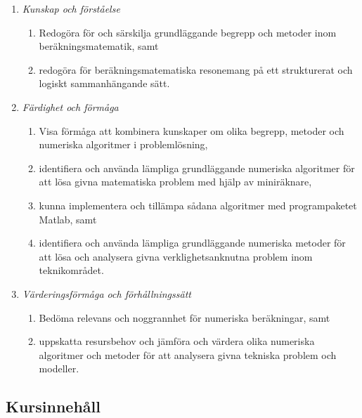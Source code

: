 \begin{enumerate}
\def\labelenumi{\Alph{enumi}.}
\tightlist
\item
  \emph{Kunskap och förståelse}

  \begin{enumerate}
  \def\labelenumii{\Alph{enumi}.\arabic{enumii}.}
  \tightlist
  \item
    Redogöra för och särskilja grundläggande begrepp och metoder inom
    beräkningsmatematik, samt
  \item
    redogöra för beräkningsmatematiska resonemang på ett strukturerat
    och logiskt sammanhängande sätt.
  \end{enumerate}
\item
  \emph{Färdighet och förmåga}

  \begin{enumerate}
  \def\labelenumii{\Alph{enumi}.\arabic{enumii}.}
  \tightlist
  \item
    Visa förmåga att kombinera kunskaper om olika begrepp, metoder och
    numeriska algoritmer i problemlösning,
  \item
    identifiera och använda lämpliga grundläggande numeriska algoritmer
    för att lösa givna matematiska problem med hjälp av miniräknare,
  \item
    kunna implementera och tillämpa sådana algoritmer med programpaketet
    Matlab, samt
  \item
    identifiera och använda lämpliga grundläggande numeriska metoder för
    att lösa och analysera givna verklighetsanknutna problem inom
    teknikområdet.
  \end{enumerate}
\item
  \emph{Värderingsförmåga och förhållningssätt}

  \begin{enumerate}
  \def\labelenumii{\Alph{enumi}.\arabic{enumii}.}
  \tightlist
  \item
    Bedöma relevans och noggrannhet för numeriska beräkningar, samt
  \item
    uppskatta resursbehov och jämföra och värdera olika numeriska
    algoritmer och metoder för att analysera givna tekniska problem och
    modeller.
  \end{enumerate}
\end{enumerate}

\subsection*{Kursinnehåll}

